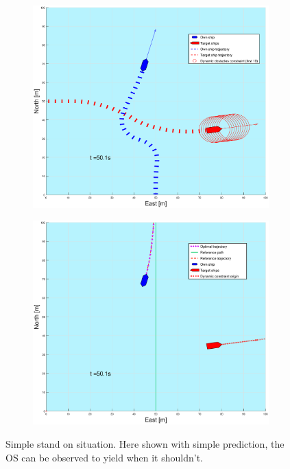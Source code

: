 \begin{figure}[ht!]
\begin{subfigure}[b]{0.499\textwidth}
    \end{subfigure}
    \hfill
    \\
    \begin{subfigure}[b]{0.49\textwidth}
        \centering
        \includegraphics[width=\textwidth]{Images/Figures/enkel_SO/_Simple_1fig1_time=50}
    \end{subfigure}
    \hfill
    \begin{subfigure}[b]{0.499\textwidth}
        \centering
        \includegraphics[width=\textwidth]{Images/Figures/enkel_SO/_Simple_1fig999_time=50}
    \end{subfigure}
    \hfill
    \caption{Simple stand on situation. Here shown with simple prediction, the \gls{OS} can be observed to yield when it shouldn't.}
    \label{FIG: Simple SO simple pred}
\end{figure}%
